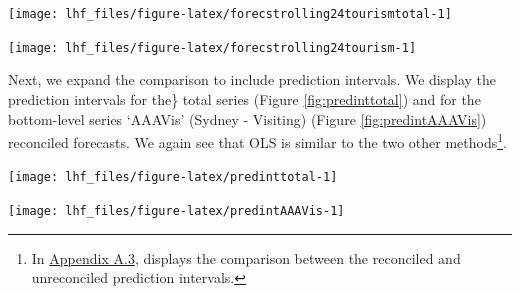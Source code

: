 \documentclass[11pt,a4paper,]{article}
\let\origfigure\figure
\let\endorigfigure\endfigure
\renewenvironment{figure}[1][2] {
    \expandafter\origfigure\expandafter[!htbp]
} {
    \endorigfigure
}
\begin{document}
\begin{figure}

{\centering \texttt{[image: lhf\_files/figure-latex/forecstrolling24tourismtotal-1]} 

}

\caption{Comparing ETS, ARIMA and OLS forecasts (reconciled and unreconciled) for `Total' series. (Top: rolling origin, Bottom: fixed origin).}\label{fig:forecstrolling24tourismtotal}
\end{figure}

\begin{figure}

{\centering \texttt{[image: lhf\_files/figure-latex/forecstrolling24tourism-1]} 

}

\caption{Comparing ETS, ARIMA and OLS forecasts (reconciled and unreconciled) for `AAAVis' bottom-level series. (Top: rolling origin, Bottom: fixed origin).}\label{fig:forecstrolling24tourism}
\end{figure}

Next, we expand the comparison to include prediction intervals. We display the prediction intervals for the\} total series (Figure \ref{fig:predinttotal}) and for the bottom-level series `AAAVis' (Sydney - Visiting) (Figure \ref{fig:predintAAAVis}) reconciled forecasts. We again see that OLS is similar to the two other methods\footnote{In \protect\hyperlink{appendixA.3}{Appendix A.3}, displays the comparison between the reconciled and unreconciled prediction intervals.}.

\begin{figure}

{\centering \texttt{[image: lhf\_files/figure-latex/predinttotal-1]} 

}

\caption{Comparing ETS, ARIMA and OLS reconciled forecasts and prediction intervals for `Total' series. (Top: rolling origin, Bottom: fixed origin).}\label{fig:predinttotal}
\end{figure}

\begin{figure}

{\centering \texttt{[image: lhf\_files/figure-latex/predintAAAVis-1]} 

}

\caption{Comparing ETS, ARIMA and OLS reconciled forecasts and prediction intervals for `AAAVis' bottom-level series. (Top: rolling origin, Bottom: fixed origin).}\label{fig:predintAAAVis}
\end{figure}
\end{document}
